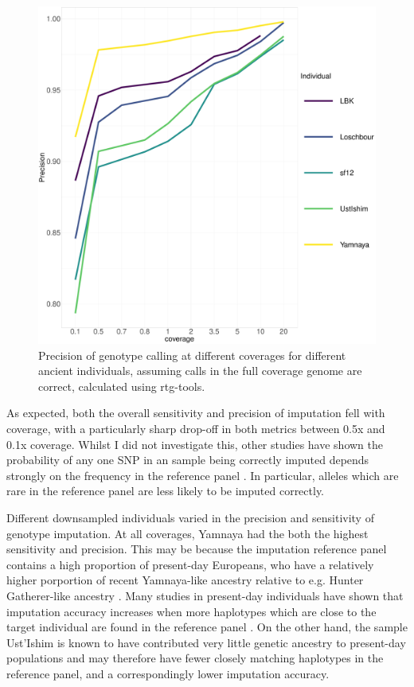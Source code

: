 {\begin{figure}[htp]
    \centering
    \includegraphics[width=1.0\textwidth]{../images/chapter1/allDownsampled_rtgtools_Precision.pdf}
    \caption{Precision of genotype calling at different coverages for different ancient individuals, assuming calls in the full coverage genome are correct,  calculated using rtg-tools.}
    \label{fig:precision_downsampled_rtgtools}
\end{figure}

As expected, both the overall sensitivity and precision of imputation fell with coverage, with a particularly sharp drop-off in both metrics between 0.5x and 0.1x coverage. Whilst I did not investigate this, other studies have shown the probability of any one SNP in an sample being correctly imputed depends strongly on the frequency in the reference panel \cite{hui2020evaluating, rubinacci2021efficient}. In particular, alleles which are rare in the reference panel are less likely to be imputed correctly.

Different downsampled individuals varied in the precision and sensitivity of genotype imputation. At all coverages, Yamnaya had the both the highest sensitivity and precision. This may be because the imputation reference panel contains a high proportion of present-day Europeans, who have a relatively higher porportion of recent Yamnaya-like ancestry relative to e.g. Hunter Gatherer-like ancestry \cite{Haak2005}. Many studies in present-day individuals have shown that imputation accuracy increases when more haplotypes which are close to the target individual are found in the reference panel \cite{HUANG2009235, delaneau2018integrative}. On the other hand, the sample Ust'Ishim is known to have contributed very little genetic ancestry to present-day populations \cite{Prufer2014} and may therefore have fewer closely matching haplotypes in the reference panel, and a correspondingly lower imputation accuracy. 

}
